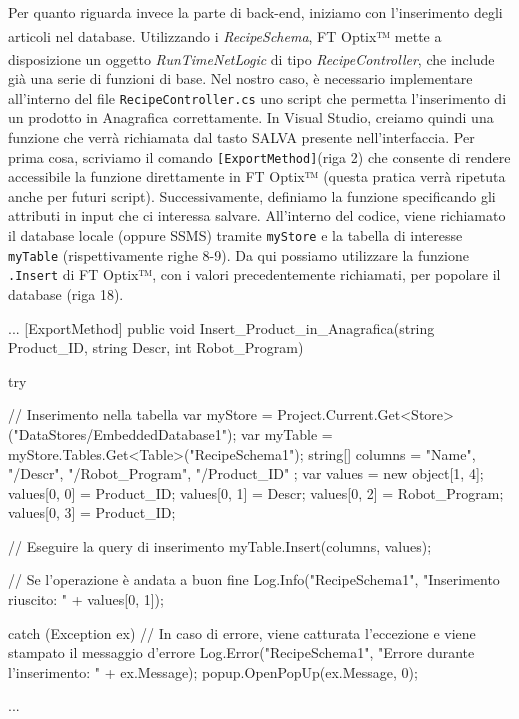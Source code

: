 Per quanto riguarda invece la parte di back-end, iniziamo con l'inserimento degli articoli nel database. Utilizzando i \textit{RecipeSchema}\textsuperscript{\cite{factorytalk_recipes}}, FT Optix™ mette a disposizione un oggetto \textit{RunTimeNetLogic}\textsuperscript{\cite{factorytalk_netlogic}} di tipo \textit{RecipeController}, che include già una serie di funzioni di base. Nel nostro caso, è necessario implementare all'interno del file \verb|RecipeController.cs| uno script che permetta l'inserimento di un prodotto in Anagrafica correttamente. In Visual Studio, creiamo quindi una funzione che verrà richiamata dal tasto SALVA presente nell'interfaccia. Per prima cosa, scriviamo il comando \verb|[ExportMethod]|(riga 2) che consente di rendere accessibile la funzione direttamente in FT Optix™ (questa pratica verrà ripetuta anche per futuri script). Successivamente, definiamo la funzione specificando gli attributi in input che ci interessa salvare. All'interno del codice, viene richiamato il database locale (oppure SSMS) tramite \verb|myStore| e la tabella di interesse \verb|myTable| (rispettivamente righe 8-9). Da qui possiamo utilizzare la funzione \verb|.Insert| di FT Optix™, con i valori precedentemente richiamati, per popolare il database (riga 18).
\begin{csharp}
...
    [ExportMethod]
    public void Insert_Product_in_Anagrafica(string Product_ID, string Descr, int Robot_Program)
    {
        try
        {
            // Inserimento nella tabella
            var myStore = Project.Current.Get<Store>("DataStores/EmbeddedDatabase1");
            var myTable = myStore.Tables.Get<Table>("RecipeSchema1");
            string[] columns = { "Name", "/Descr", "/Robot_Program", "/Product_ID" };
            var values = new object[1, 4];
            values[0, 0] = Product_ID;
            values[0, 1] = Descr;
            values[0, 2] = Robot_Program;
            values[0, 3] = Product_ID;
    
            // Eseguire la query di inserimento
            myTable.Insert(columns, values);
    
            // Se l'operazione è andata a buon fine
            Log.Info("RecipeSchema1", "Inserimento riuscito: " + values[0, 1]);
        }
        catch (Exception ex)
        {
            // In caso di errore, viene catturata l'eccezione e viene stampato il messaggio d'errore
            Log.Error("RecipeSchema1", "Errore durante l'inserimento: " + ex.Message);
            popup.OpenPopUp(ex.Message, 0);
        }
    }
...
\end{csharp}
